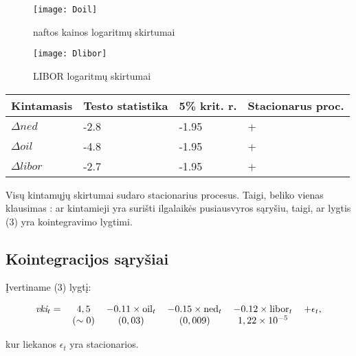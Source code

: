 \documentclass[a4paper]{article}
\begin{document}
\begin{figure}[h!]
\center
\texttt{[image: Doil]}
\caption{naftos kainos  logaritmų skirtumai}
\end{figure}

\begin{figure}[h!]
\center
\texttt{[image: Dlibor]}
\caption{LIBOR  logaritmų skirtumai}
\end{figure}

\begin{table}[!h]
\begin{center}
\begin{tabular}{llll}
  \hline
Kintamasis & Testo statistika & 5\% krit. r. & Stacionarus proc. \\ 
  \hline
$\Delta\textit{ned}$ & -2.8 & -1.95 & + \\
$\Delta\textit{oil}$ & -4.8 & -1.95 & + \\
$\Delta\textit{libor}$ & -2.7 & -1.95 & + \\ 
   \hline
\end{tabular}
\end{center}
\end{table} \indent

Visų kintamųjų skirtumai sudaro stacionarius procesus. Taigi, beliko vienas klausimas : ar kintamieji yra surišti ilgalaikės pusiausvyros sąryšiu, taigi, ar lygtis (3) yra kointegravimo lygtimi. \newpage
\subsection{Kointegracijos sąryšiai} \indent

Įvertiname (3) lygtį:

\begin{equation}
\begin{minipage}[b]{0.9\linewidth}
\begin{center}
\begin{tabular}{cccccccccc} 
$\textit{vki}_t =$ & $4,5$ & $-0.11 \times \text{oil}_t$ & $-0.15 \times \text{ned}_t$ & $-0.12 \times \text{libor}_t$ & $+ \epsilon_t$,\\ 
  & $(\sim 0)$ & $(0,03)$ & $(0,009)$ & $1,22 \times 10^{-5}$ \\ 
\end{tabular} 
\end{center}
\end{minipage}
\end{equation}

kur liekanos $\epsilon_t$  yra stacionarios.
\end{document}
